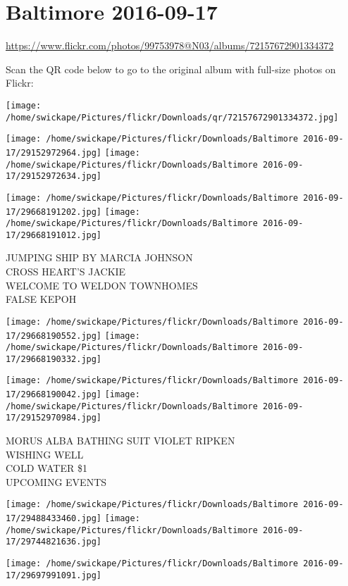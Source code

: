 \documentclass[10pt,letterpaper]{article}
\title{}
\author{}
\date{}
\begin{document}
\section*{Baltimore 2016-09-17}

\url{https://www.flickr.com/photos/99753978@N03/albums/72157672901334372}

Scan the QR code below to go to the original album with full-size photos on Flickr:

\texttt{[image: /home/swickape/Pictures/flickr/Downloads/qr/72157672901334372.jpg]}
\pagebreak

\texttt{[image: /home/swickape/Pictures/flickr/Downloads/Baltimore 2016-09-17/29152972964.jpg]}
\texttt{[image: /home/swickape/Pictures/flickr/Downloads/Baltimore 2016-09-17/29152972634.jpg]}

\texttt{[image: /home/swickape/Pictures/flickr/Downloads/Baltimore 2016-09-17/29668191202.jpg]}
\texttt{[image: /home/swickape/Pictures/flickr/Downloads/Baltimore 2016-09-17/29668191012.jpg]}

JUMPING SHIP BY MARCIA JOHNSON\\
CROSS HEART'S JACKIE\\
WELCOME TO WELDON TOWNHOMES\\
FALSE KEPOH
\pagebreak

\texttt{[image: /home/swickape/Pictures/flickr/Downloads/Baltimore 2016-09-17/29668190552.jpg]}
\texttt{[image: /home/swickape/Pictures/flickr/Downloads/Baltimore 2016-09-17/29668190332.jpg]}

\texttt{[image: /home/swickape/Pictures/flickr/Downloads/Baltimore 2016-09-17/29668190042.jpg]}
\texttt{[image: /home/swickape/Pictures/flickr/Downloads/Baltimore 2016-09-17/29152970984.jpg]}

MORUS ALBA BATHING SUIT VIOLET RIPKEN\\
WISHING WELL\\
COLD WATER \$1\\
UPCOMING EVENTS
\pagebreak

\texttt{[image: /home/swickape/Pictures/flickr/Downloads/Baltimore 2016-09-17/29488433460.jpg]}
\texttt{[image: /home/swickape/Pictures/flickr/Downloads/Baltimore 2016-09-17/29744821636.jpg]}

\texttt{[image: /home/swickape/Pictures/flickr/Downloads/Baltimore 2016-09-17/29697991091.jpg]}
\end{document}
